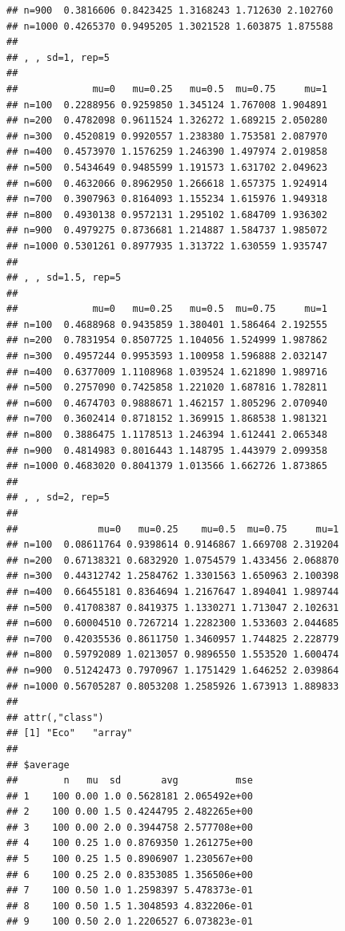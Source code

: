 \documentclass[11pt,a4paper]{article}
\begin{document}
\begin{verbatim}
## n=900  0.3816606 0.8423425 1.3168243 1.712630 2.102760
## n=1000 0.4265370 0.9495205 1.3021528 1.603875 1.875588
## 
## , , sd=1, rep=5
## 
##             mu=0   mu=0.25   mu=0.5  mu=0.75     mu=1
## n=100  0.2288956 0.9259850 1.345124 1.767008 1.904891
## n=200  0.4782098 0.9611524 1.326272 1.689215 2.050280
## n=300  0.4520819 0.9920557 1.238380 1.753581 2.087970
## n=400  0.4573970 1.1576259 1.246390 1.497974 2.019858
## n=500  0.5434649 0.9485599 1.191573 1.631702 2.049623
## n=600  0.4632066 0.8962950 1.266618 1.657375 1.924914
## n=700  0.3907963 0.8164093 1.155234 1.615976 1.949318
## n=800  0.4930138 0.9572131 1.295102 1.684709 1.936302
## n=900  0.4979275 0.8736681 1.214887 1.584737 1.985072
## n=1000 0.5301261 0.8977935 1.313722 1.630559 1.935747
## 
## , , sd=1.5, rep=5
## 
##             mu=0   mu=0.25   mu=0.5  mu=0.75     mu=1
## n=100  0.4688968 0.9435859 1.380401 1.586464 2.192555
## n=200  0.7831954 0.8507725 1.104056 1.524999 1.987862
## n=300  0.4957244 0.9953593 1.100958 1.596888 2.032147
## n=400  0.6377009 1.1108968 1.039524 1.621890 1.989716
## n=500  0.2757090 0.7425858 1.221020 1.687816 1.782811
## n=600  0.4674703 0.9888671 1.462157 1.805296 2.070940
## n=700  0.3602414 0.8718152 1.369915 1.868538 1.981321
## n=800  0.3886475 1.1178513 1.246394 1.612441 2.065348
## n=900  0.4814983 0.8016443 1.148795 1.443979 2.099358
## n=1000 0.4683020 0.8041379 1.013566 1.662726 1.873865
## 
## , , sd=2, rep=5
## 
##              mu=0   mu=0.25    mu=0.5  mu=0.75     mu=1
## n=100  0.08611764 0.9398614 0.9146867 1.669708 2.319204
## n=200  0.67138321 0.6832920 1.0754579 1.433456 2.068870
## n=300  0.44312742 1.2584762 1.3301563 1.650963 2.100398
## n=400  0.66455181 0.8364694 1.2167647 1.894041 1.989744
## n=500  0.41708387 0.8419375 1.1330271 1.713047 2.102631
## n=600  0.60004510 0.7267214 1.2282300 1.533603 2.044685
## n=700  0.42035536 0.8611750 1.3460957 1.744825 2.228779
## n=800  0.59792089 1.0213057 0.9896550 1.553520 1.600474
## n=900  0.51242473 0.7970967 1.1751429 1.646252 2.039864
## n=1000 0.56705287 0.8053208 1.2585926 1.673913 1.889833
## 
## attr(,"class")
## [1] "Eco"   "array"
## 
## $average
##        n   mu  sd       avg          mse
## 1    100 0.00 1.0 0.5628181 2.065492e+00
## 2    100 0.00 1.5 0.4244795 2.482265e+00
## 3    100 0.00 2.0 0.3944758 2.577708e+00
## 4    100 0.25 1.0 0.8769350 1.261275e+00
## 5    100 0.25 1.5 0.8906907 1.230567e+00
## 6    100 0.25 2.0 0.8353085 1.356506e+00
## 7    100 0.50 1.0 1.2598397 5.478373e-01
## 8    100 0.50 1.5 1.3048593 4.832206e-01
## 9    100 0.50 2.0 1.2206527 6.073823e-01

\end{verbatim}
\end{document}
